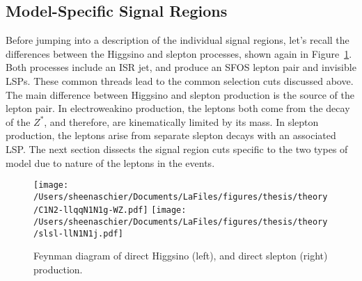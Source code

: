   \FloatBarrier
  \subsection{Model-Specific Signal Regions}
  \label{sec:sr:uncommon}
   
 Before jumping into a description of the individual signal regions, let's recall the differences between the Higgsino and slepton processes, shown again in Figure~\ref{fig:sr:fn}.  Both processes include an ISR jet, and produce an SFOS lepton pair and invisible LSPs.  These common threads lead to the common selection cuts discussed above.  The main difference between Higgsino and slepton production is the source of the lepton pair.  In electroweakino production, the leptons both come from the decay of the $Z^*$, and therefore, are kinematically limited by its mass.  In slepton production, the leptons arise from separate slepton decays with an associated LSP.  The next section dissects the signal region cuts specific to the two types of model due to nature of the leptons in the events. 
  \begin{figure}%
  \begin{center}
  \texttt{[image: /Users/sheenaschier/Documents/LaFiles/figures/thesis/theory/C1N2-llqqN1N1g-WZ.pdf]}
   \texttt{[image: /Users/sheenaschier/Documents/LaFiles/figures/thesis/theory/slsl-llN1N1j.pdf]}
   \end{center}
 \caption{Feynman diagram of direct Higgsino (left), and direct slepton (right) production.}
 \label{fig:sr:fn}
 \end{figure}
